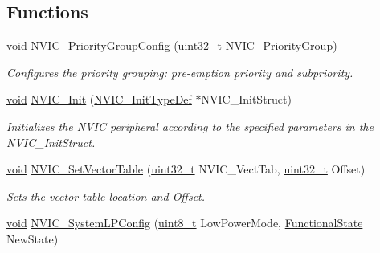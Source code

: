 \subsection*{Functions}
\begin{DoxyCompactItemize}
\item 
\hyperlink{usb__devapi_8h_afabf60e7f57651d6d595a02c75f07cd0}{void} \hyperlink{group___m_i_s_c___exported___functions_gadfb1f34f803ce54c976643db8c484442}{N\+V\+I\+C\+\_\+\+Priority\+Group\+Config} (\hyperlink{_p_e___types_8h_a33594304e786b158f3fb30289278f5af}{uint32\+\_\+t} N\+V\+I\+C\+\_\+\+Priority\+Group)
\begin{DoxyCompactList}\small\item\em Configures the priority grouping\+: pre-\/emption priority and subpriority. \end{DoxyCompactList}\item 
\hyperlink{usb__devapi_8h_afabf60e7f57651d6d595a02c75f07cd0}{void} \hyperlink{group___m_i_s_c___exported___functions_ga4ab373ed0870c06fca5eb51d639adf41}{N\+V\+I\+C\+\_\+\+Init} (\hyperlink{struct_n_v_i_c___init_type_def}{N\+V\+I\+C\+\_\+\+Init\+Type\+Def} $\ast$N\+V\+I\+C\+\_\+\+Init\+Struct)
\begin{DoxyCompactList}\small\item\em Initializes the N\+V\+IC peripheral according to the specified parameters in the N\+V\+I\+C\+\_\+\+Init\+Struct. \end{DoxyCompactList}\item 
\hyperlink{usb__devapi_8h_afabf60e7f57651d6d595a02c75f07cd0}{void} \hyperlink{group___m_i_s_c___exported___functions_ga1145208ad70edfc2fab19b8b8ef1b1a1}{N\+V\+I\+C\+\_\+\+Set\+Vector\+Table} (\hyperlink{_p_e___types_8h_a33594304e786b158f3fb30289278f5af}{uint32\+\_\+t} N\+V\+I\+C\+\_\+\+Vect\+Tab, \hyperlink{_p_e___types_8h_a33594304e786b158f3fb30289278f5af}{uint32\+\_\+t} Offset)
\begin{DoxyCompactList}\small\item\em Sets the vector table location and Offset. \end{DoxyCompactList}\item 
\hyperlink{usb__devapi_8h_afabf60e7f57651d6d595a02c75f07cd0}{void} \hyperlink{group___m_i_s_c___exported___functions_gae21011c5232f5b8f366acbecd12a1d4a}{N\+V\+I\+C\+\_\+\+System\+L\+P\+Config} (\hyperlink{_p_e___types_8h_aba7bc1797add20fe3efdf37ced1182c5}{uint8\+\_\+t} Low\+Power\+Mode, \hyperlink{agilefox_2library_2inc_2stm32f10x__type_8h_ac9a7e9a35d2513ec15c3b537aaa4fba1}{Functional\+State} New\+State)

\end{DoxyCompactItemize}
